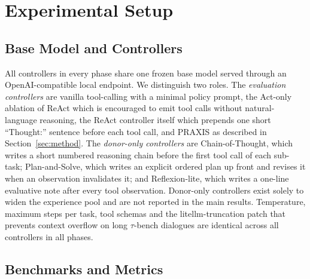 \documentclass[conference]{IEEEtran}
\begin{document}
\section{Experimental Setup}

\subsection{Base Model and Controllers}

All controllers in every phase share one frozen base model served
through an OpenAI-compatible local endpoint. We distinguish two
roles. The \emph{evaluation controllers} are vanilla tool-calling
with a minimal policy prompt, the Act-only ablation of ReAct
which is encouraged to emit tool calls without natural-language
reasoning, the ReAct controller itself which prepends one short
``Thought:'' sentence before each tool call, and PRAXIS as
described in Section~\ref{sec:method}. The \emph{donor-only
controllers} are Chain-of-Thought, which writes a short numbered
reasoning chain before the first tool call of each sub-task;
Plan-and-Solve, which writes an explicit ordered plan up front
and revises it when an observation invalidates it; and
Reflexion-lite, which writes a one-line evaluative note after
every tool observation. Donor-only controllers exist solely to
widen the experience pool and are not reported in the main
results. Temperature, maximum steps per task, tool schemas and
the litellm-truncation patch that prevents context overflow on
long $\tau$-bench dialogues are identical across all controllers
in all phases.

\subsection{Benchmarks and Metrics}
\end{document}
